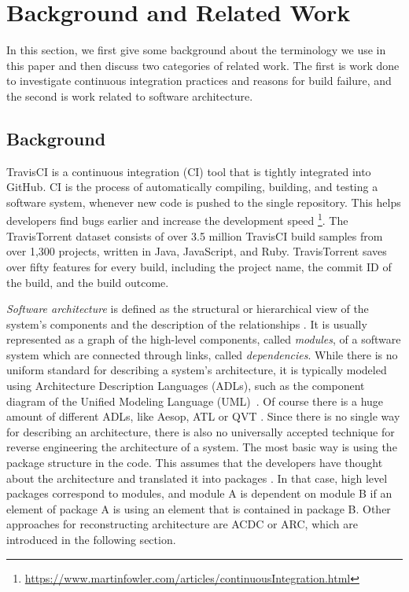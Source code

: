 \documentclass[sigplan, anonymous, review]{acmart}
\begin{document}
\section{Background and Related Work}

In this section, we first give some background about the terminology we use in this paper and then discuss two categories of related work. The first is work done to investigate continuous integration practices and reasons for build failure, and the second is work related to software architecture.

\subsection{Background}
TravisCI is a continuous integration (CI) tool that is tightly integrated into GitHub. CI is the process of automatically compiling, building, and testing a software system, whenever new code is pushed to the single repository. This helps developers find bugs earlier and increase the development speed \footnote{\url{https://www.martinfowler.com/articles/continuousIntegration.html}}. 
The TravisTorrent dataset \cite{TravisTorrent} consists of over 3.5 million TravisCI build samples from over 1,300 projects, written in Java, JavaScript, and Ruby.
TravisTorrent saves over fifty features for every build, including the project name, the commit ID of the build, and the build outcome.

\textit{Software architecture} is defined as the structural or hierarchical view of the system's components and the description of the relationships \cite{arcDef}. It is usually represented as a graph of the high-level components, called \textit{modules}, of a software system which are connected through links, called \textit{dependencies}. While there is no uniform standard for describing a system's architecture, it is typically modeled using Architecture Description Languages (ADLs), such as the component diagram of the Unified Modeling Language (UML)~\cite{UML-Arch}. Of course there is a huge amount of different ADLs, like Aesop, ATL or QVT \cite{ADLs1, ADLs2}.
Since there is no single way for describing an architecture, there is also no universally accepted technique for reverse engineering the architecture of a system. The most basic way is using the package structure in the code. This assumes that the developers have thought about the architecture and translated it into packages \cite{arcPkg}. In that case, high level packages correspond to modules, and module A is dependent on module B if an element of package A is using an element that is contained in package B. 
Other approaches for reconstructing architecture are ACDC or ARC, which are introduced in the following section.
\end{document}

